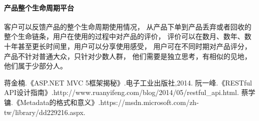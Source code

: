 \documentclass{book}
\begin{document}
\paragraph{产品整个生命周期平台}客户可以反馈产品的整个生命周期使用情况，
从产品下单到产品丢弃或者回收的整个生命链条，用户在使用的过程中对产品的评价，
评价可以在数月、数年、数十年甚至更长时间里，用户可以分享使用感受，
用户可在不同时期对产品评分，产品不针对普通大众，只针对少数人群，
他们需要是独立思考，有相似的见地，他们属于少部分人。

\begin{thebibliography}{0}
蒋金楠.《ASP.NET MVC 5框架揭秘》.电子工业出版社,2014.
阮一峰.《RESTful API设计指南》.http://www.ruanyifeng.com/blog/2014/05/restful\_api.html.
蔡学镛.《Metadata的格式和意义》.https://msdn.microsoft.com/zh-tw/library/dd229216.aspx.
\end{thebibliography}

\end{document}

